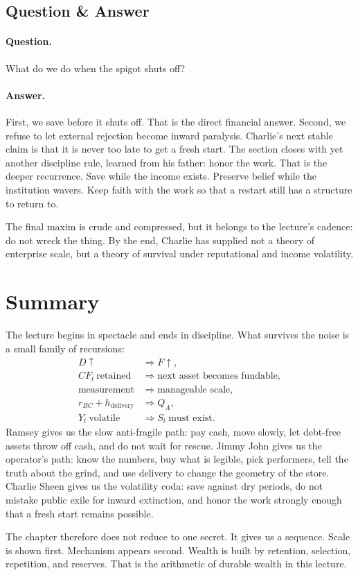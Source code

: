 \subsection{Question \& Answer}

\paragraph{Question.} What do we do when the spigot shuts off?

\paragraph{Answer.} First, we save before it shuts off. That is the direct financial answer. Second, we refuse to let external rejection become inward paralysis. Charlie's next stable claim is that it is never too late to get a fresh start. The section closes with yet another discipline rule, learned from his father: honor the work. That is the deeper recurrence. Save while the income exists. Preserve belief while the institution wavers. Keep faith with the work so that a restart still has a structure to return to.

The final maxim is crude and compressed, but it belongs to the lecture's cadence: do not wreck the thing. By the end, Charlie has supplied not a theory of enterprise scale, but a theory of survival under reputational and income volatility.

\section{Summary}

The lecture begins in spectacle and ends in discipline. What survives the noise is a small family of recursions:
\begin{align}
D\uparrow &\Rightarrow F\uparrow,\\
CF_t\ \text{retained} &\Rightarrow \text{next asset becomes fundable},\\
\text{measurement} &\Rightarrow \text{manageable scale},\\
r_{BC}+h_{\mathrm{delivery}} &\Rightarrow Q_A,\\
Y_t\ \text{volatile} &\Rightarrow S_t\ \text{must exist}.
\end{align}
Ramsey gives us the slow anti-fragile path: pay cash, move slowly, let debt-free assets throw off cash, and do not wait for rescue. Jimmy John gives us the operator's path: know the numbers, buy what is legible, pick performers, tell the truth about the grind, and use delivery to change the geometry of the store. Charlie Sheen gives us the volatility coda: save against dry periods, do not mistake public exile for inward extinction, and honor the work strongly enough that a fresh start remains possible.

The chapter therefore does not reduce to one secret. It gives us a sequence. Scale is shown first. Mechanism appears second. Wealth is built by retention, selection, repetition, and reserves. That is the arithmetic of durable wealth in this lecture.